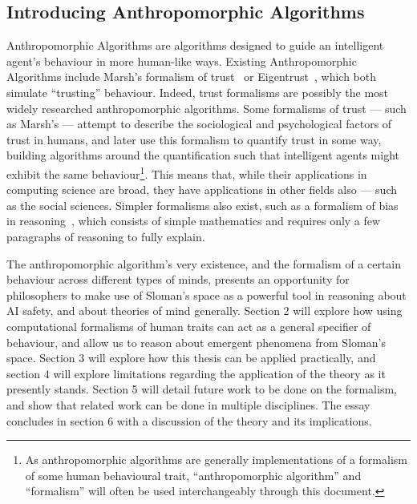 \subsection{Introducing Anthropomorphic Algorithms}
Anthropomorphic Algorithms are algorithms designed to guide an intelligent agent's behaviour in more human-like ways. Existing Anthropomorphic Algorithms include Marsh's formalism of trust~\citep{Marsh1994FormalisingConcept} or Eigentrust~\citep{eigentrust}, which both simulate ``trusting'' behaviour. Indeed, trust formalisms are possibly the most widely researched anthropomorphic algorithms. Some formalisms of trust --- such as Marsh's --- attempt to describe the sociological and psychological factors of trust in humans, and later use this formalism to quantify trust in some way, building algorithms around the quantification such that intelligent agents might exhibit the same behaviour\footnote{As anthropomorphic algorithms are generally implementations of a formalism of some human behavioural trait, ``anthropomorphic algorithm'' and ``formalism'' will often be used interchangeably through this document.}. This means that, while their applications in computing science are broad, they have applications in other fields also --- such as the social sciences. Simpler formalisms also exist, such as a formalism of bias in reasoning~\cite{armstrong_bias}, which consists of simple mathematics and requires only a few paragraphs of reasoning to fully explain.\par

The anthropomorphic algorithm's very existence, and the formalism of a certain behaviour across different types of minds, presents an opportunity for philosophers to make use of Sloman's space as a powerful tool in reasoning about AI safety, and about theories of mind generally. Section 2 will explore how using computational formalisms of human traits can act as a general specifier of behaviour, and allow us to reason about emergent phenomena from Sloman's space. Section 3 will explore how this thesis can be applied practically, and section 4 will explore limitations regarding the application of the theory as it presently stands. Section 5 will detail future work to be done on the formalism, and show that related work can be done in multiple disciplines. The essay concludes in section 6 with a discussion of the theory and its implications.\par
